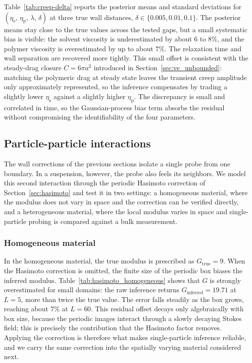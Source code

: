 \documentclass{elsarticle}
\begin{document}
Table~\ref{tab:creep-delta} reports the posterior means and standard
deviations for
$(\eta_{\mathrm{s}},\,\eta_{\mathrm{p}},\,\lambda,\,\delta)$ at three
true wall distances, $\delta \in \{0.005, 0.01, 0.1\}$. The posterior
means stay close to the true values across the tested gaps, but a small
systematic bias is visible: the solvent viscosity is underestimated by
about $6$ to $8\%$, and the polymer viscosity is overestimated by up to
about $7\%$. The relaxation time and wall separation are recovered more
tightly. This small offset is consistent with the steady-drag closure
$C=6\pi a^{2}$ introduced in Section~\ref{sec:ve_unbounded}: matching
the polymeric drag at steady state leaves the transient creep amplitude
only approximately represented, so the inference compensates by trading
a slightly lower $\eta_{\mathrm{s}}$ against a slightly higher
$\eta_{\mathrm{p}}$. The discrepancy is small and correlated in time, so
the Gaussian-process bias term absorbs the residual without compromising
the identifiability of the four parameters.

\FloatBarrier

\subsection{Particle-particle interactions}
\label{sec:pp_results}

The wall corrections of the previous sections isolate a single probe from
one boundary. In a suspension, however, the probe also feels its
neighbors. We model this second interaction through the periodic Hasimoto
correction of Section~\ref{sec:hasimoto} and test it in two settings: a
homogeneous material, where the modulus does not vary in space and the
correction can be verified directly, and a heterogeneous material, where
the local modulus varies in space and single-particle probing is compared
against a bulk measurement.

\subsubsection{Homogeneous material}
\label{sec:pp_homogeneous}

In the homogeneous material, the true modulus is prescribed as
$G_{\mathrm{true}} = 9$. When the Hasimoto correction is omitted, the
finite size of the periodic box biases the inferred modulus.
Table~\ref{tab:hasimoto_homogeneous} shows that $G$ is strongly
overestimated for small domains: the raw inference returns
$G_{\mathrm{inferred}} = 19.71$ at $L = 5$, more than twice the true
value. The error falls steadily as the box grows, reaching about $7\%$ at
$L = 60$. This residual offset decays only algebraically with box size,
because the periodic images interact through a slowly decaying Stokes
field; this is precisely the contribution that the Hasimoto factor
removes. Applying the correction is therefore what makes single-particle
inference reliable, and we carry the same correction into the spatially
varying material considered next.
\end{document}
